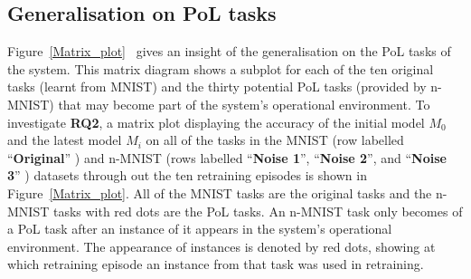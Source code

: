 \subsection{Generalisation on PoL tasks}

Figure~\ref{Matrix_plot}~ gives an insight of the generalisation on the PoL tasks of the system. 
%
This matrix diagram shows a subplot for each of the ten  original tasks (learnt from MNIST) and the thirty potential PoL tasks (provided by n-MNIST) that may become part of the system's operational environment.  
%
To investigate \textbf{RQ2}, a matrix plot displaying the accuracy of the initial model $M_0$ and the latest model $M_i$ on all of the tasks in the MNIST (row labelled ``\textbf{Original}'' ) and n-MNIST (rows labelled ``\textbf{Noise 1}'', ``\textbf{Noise 2}'', and ``\textbf{Noise 3}'' ) datasets through out the ten retraining episodes is shown in Figure~\ref{Matrix_plot}.  
%
All of the MNIST tasks are the original tasks and the n-MNIST tasks with red dots are the PoL tasks. 
An n-MNIST task
only becomes of a PoL task after an instance of it appears in the system's operational environment. 
%
%
The appearance of instances is denoted by red dots, showing at which retraining episode an instance from that task was used in retraining.

%
%
%

